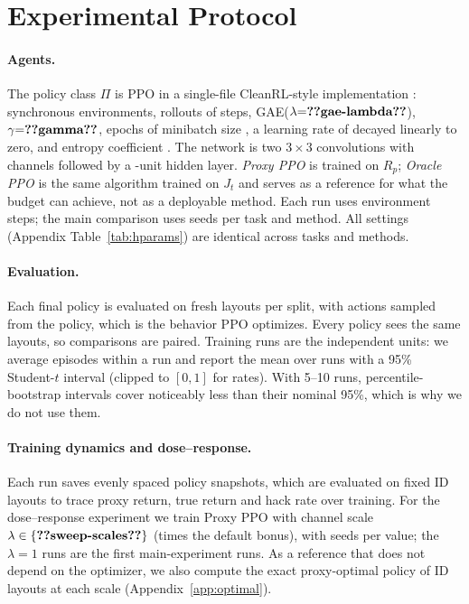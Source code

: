 \section{Experimental Protocol}
\label{sec:protocol}

\paragraph{Agents.} The policy class $\Pi$ is PPO \citep{schulman2017ppo} in a
single-file CleanRL-style implementation \citep{huang2022cleanrl}:
 synchronous environments, rollouts of  steps,
GAE($\lambda{=}\res{gae-lambda}$), $\gamma{=}\res{gamma}$,  epochs
of minibatch size , a learning rate of  decayed linearly
to zero, and entropy coefficient . The network is two $3{\times}3$
convolutions with  channels followed by a -unit hidden
layer. \emph{Proxy PPO} is trained on $R_p$; \emph{Oracle PPO} is the same
algorithm trained on $J_t$ and serves as a reference for what the budget can
achieve, not as a deployable method. Each run uses  environment
steps; the main comparison uses  seeds per task and method. All
settings (Appendix Table~\ref{tab:hparams}) are identical across tasks and
methods.

\paragraph{Evaluation.} Each final policy is evaluated on 
fresh layouts per split, with actions sampled from the policy, which is the
behavior PPO optimizes. Every policy sees the same layouts, so comparisons are
paired. Training runs are the independent units: we average episodes within a
run and report the mean over runs with a 95\% Student-$t$ interval (clipped to
$[0,1]$ for rates). With 5--10 runs, percentile-bootstrap intervals cover
noticeably less than their nominal 95\%, which is why we do not use them.

\paragraph{Training dynamics and dose--response.} Each run saves
 evenly spaced policy snapshots, which are evaluated on
 fixed ID layouts to trace proxy return, true return and
hack rate over training. For the dose--response experiment we train Proxy PPO
with channel scale $\lambda\in\{\res{sweep-scales}\}$ (times the default
bonus), with  seeds per value; the $\lambda=1$ runs are the
first  main-experiment runs. As a reference that does not
depend on the optimizer, we also compute the exact proxy-optimal policy of
 ID layouts at each scale (Appendix~\ref{app:optimal}).

